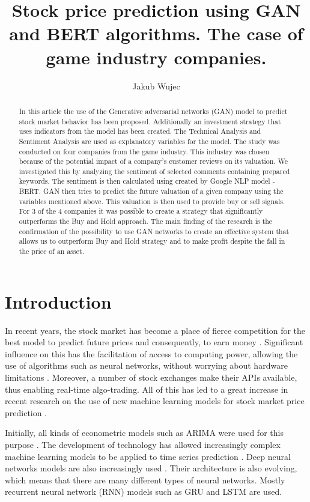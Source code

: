 \documentclass[11pt]{article} %
\title{Stock price prediction using GAN and BERT algorithms. The case of game industry companies.}
\author{Jakub Wujec}
\begin{document}
\maketitle


\begin{abstract} In this article the use of the Generative adversarial networks (GAN) model to predict stock market behavior has been proposed. Additionally an investment strategy that uses indicators from the model has been created. The Technical Analysis and Sentiment Analysis are used as explanatory variables for the model. The study was conducted on four companies from the game industry. This industry was chosen because of the potential impact of a company's customer reviews on its valuation. We investigated this by analyzing the sentiment of selected comments containing prepared keywords. The sentiment is then calculated using created by Google NLP model - BERT. GAN then tries to predict the future valuation of a given company using the variables mentioned above. This valuation is then used to provide buy or sell signals. For 3 of the 4 companies it was possible to create a strategy that significantly outperforms the Buy and Hold approach. The main finding of the research is the confirmation of the possibility to use GAN networks to create an effective system that allows us to outperform Buy and Hold strategy and to make profit despite the fall in the price of an asset.
\end{abstract}

\section{Introduction}
In recent years, the stock market has become a place of fierce competition for the best model to predict future prices and consequently, to earn money \cite{ml-in-stock}. 
Significant influence on this has the facilitation of access to computing power, allowing the use of algorithms such as neural networks, without worrying about hardware limitations \cite{ml-compute}. Moreover, a number of stock exchanges make their APIs available, thus enabling real-time algo-trading. All of this has led to a great increase in recent research on the use of new machine learning models for stock market price prediction \cite{ml-studies}.  

Initially, all kinds of econometric models such as ARIMA were used for this purpose \cite{arima}. The development of technology has allowed increasingly complex machine learning models to be applied to time series prediction \cite{arima}. Deep neural networks models are also increasingly used \cite{ml-in-stock}. Their architecture is also evolving, which means that there are many different types of neural networks. Mostly recurrent neural network (RNN) models such as GRU and LSTM are used. 
\end{document}

